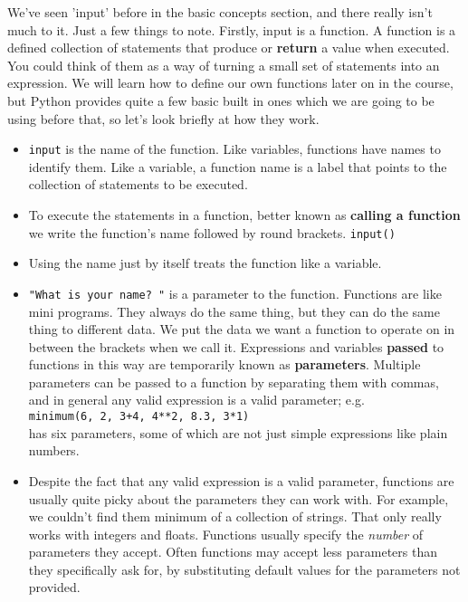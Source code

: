 We've seen 'input' before in the basic concepts section, and     there really isn't much to it. Just a few things to note.     Firstly, input is a function. A function is a defined collection of     statements that produce or \textbf{return} a value when     executed. You could think of them as a way of turning a small set of     statements into an expression. We will learn how to define our own     functions later on in the course, but Python provides quite a few basic     built in ones which we are going to be using before that, so let's look     briefly at how they work.
\begin{itemize}
	\item 
\texttt{input} is the name of the function. Like       variables, functions have names to identify them. Like a variable,       a function name is a label that points to the collection of       statements to be executed.
	\item To execute the statements in a function, better known as       \textbf{calling a function} we write the function's name       followed by round brackets. 
\texttt{input()}
	\item Using the name just by itself treats the function like a       variable. 
	\item 
\texttt{"What is your name? "} is a parameter to the       function. Functions are like mini programs. They always do the same       thing, but they can do the same thing to different data. We put the       data we want a function to operate on in between the brackets when       we call it. Expressions and variables \textbf{passed} to       functions in this way are temporarily known as       \textbf{parameters}. Multiple parameters can be passed to a       function by separating them with commas, and in general any valid       expression is a valid parameter; e.g.
\\
\texttt{minimum(6, 2,         3+4, 4**2, 8.3, 3*1)}
\\ has six parameters, some of which       are not just simple expressions like plain numbers.
	\item Despite the fact that any valid expression is a valid       parameter, functions are usually quite picky about the parameters       they can work with. For example, we couldn't find them minimum of a       collection of strings. That only really works with integers and       floats. Functions usually specify the \textit{number} of parameters       they accept. Often functions may accept less parameters than they       specifically ask for, by substituting default values for the       parameters not provided. 
\end{itemize}

